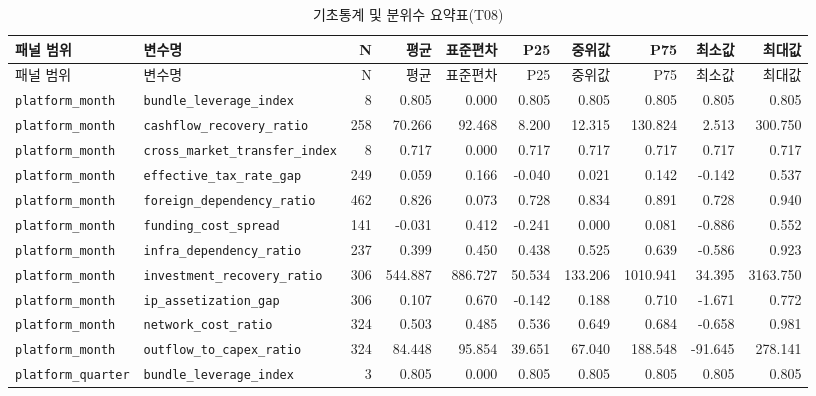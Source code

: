 \documentclass[11pt,a4paper]{report}
\begin{document}
\begin{landscape}
\scriptsize
\setlength{\tabcolsep}{3pt}
\begin{longtable}{@{}llrrrrrrrr@{}}
\caption{기초통계 및 분위수 요약표(T08)} \label{tab:results_basic_stats} \\
\toprule
\rowcolor{ReportTableHead}
패널 범위 & 변수명 & N & 평균 & 표준편차 & P25 & 중위값 & P75 & 최소값 & 최대값 \\
\midrule
\endfirsthead
\toprule
\rowcolor{ReportTableHead}
패널 범위 & 변수명 & N & 평균 & 표준편차 & P25 & 중위값 & P75 & 최소값 & 최대값 \\
\midrule
\endhead
\texttt{platform\_month} & \texttt{bundle\_leverage\_index} & 8 & 0.805 & 0.000 & 0.805 & 0.805 & 0.805 & 0.805 & 0.805 \\
\texttt{platform\_month} & \texttt{cashflow\_recovery\_ratio} & 258 & 70.266 & 92.468 & 8.200 & 12.315 & 130.824 & 2.513 & 300.750 \\
\texttt{platform\_month} & \nolinkurl{cross_market_transfer_index} & 8 & 0.717 & 0.000 & 0.717 & 0.717 & 0.717 & 0.717 & 0.717 \\
\texttt{platform\_month} & \texttt{effective\_tax\_rate\_gap} & 249 & 0.059 & 0.166 & -0.040 & 0.021 & 0.142 & -0.142 & 0.537 \\
\texttt{platform\_month} & \texttt{foreign\_dependency\_ratio} & 462 & 0.826 & 0.073 & 0.728 & 0.834 & 0.891 & 0.728 & 0.940 \\
\texttt{platform\_month} & \texttt{funding\_cost\_spread} & 141 & -0.031 & 0.412 & -0.241 & 0.000 & 0.081 & -0.886 & 0.552 \\
\texttt{platform\_month} & \texttt{infra\_dependency\_ratio} & 237 & 0.399 & 0.450 & 0.438 & 0.525 & 0.639 & -0.586 & 0.923 \\
\texttt{platform\_month} & \texttt{investment\_recovery\_ratio} & 306 & 544.887 & 886.727 & 50.534 & 133.206 & 1010.941 & 34.395 & 3163.750 \\
\texttt{platform\_month} & \texttt{ip\_assetization\_gap} & 306 & 0.107 & 0.670 & -0.142 & 0.188 & 0.710 & -1.671 & 0.772 \\
\texttt{platform\_month} & \texttt{network\_cost\_ratio} & 324 & 0.503 & 0.485 & 0.536 & 0.649 & 0.684 & -0.658 & 0.981 \\
\texttt{platform\_month} & \texttt{outflow\_to\_capex\_ratio} & 324 & 84.448 & 95.854 & 39.651 & 67.040 & 188.548 & -91.645 & 278.141 \\
\texttt{platform\_quarter} & \texttt{bundle\_leverage\_index} & 3 & 0.805 & 0.000 & 0.805 & 0.805 & 0.805 & 0.805 & 0.805 \\

\end{longtable}
\end{landscape}
\end{document}
